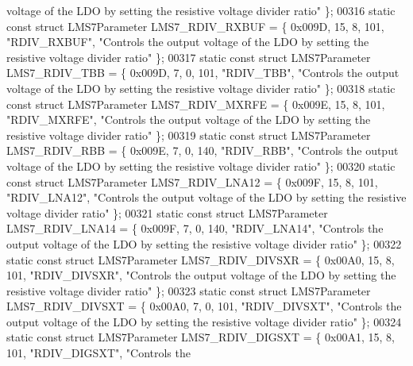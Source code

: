 \begin{DoxyCode}
{       voltage of the LDO by setting the resistive voltage divider ratio"} \};
00316 \textcolor{keyword}{static} \textcolor{keyword}{const} \textcolor{keyword}{struct }LMS7Parameter LMS7_RDIV_RXBUF = \{ 0x009D, 15, 8, 101, \textcolor{stringliteral}{"RDIV\_RXBUF"}, \textcolor{stringliteral}{"Controls the
       output voltage of the LDO by setting the resistive voltage divider ratio"} \};
00317 \textcolor{keyword}{static} \textcolor{keyword}{const} \textcolor{keyword}{struct }LMS7Parameter LMS7_RDIV_TBB = \{ 0x009D, 7, 0, 101, \textcolor{stringliteral}{"RDIV\_TBB"}, \textcolor{stringliteral}{"Controls the output
       voltage of the LDO by setting the resistive voltage divider ratio"} \};
00318 \textcolor{keyword}{static} \textcolor{keyword}{const} \textcolor{keyword}{struct }LMS7Parameter LMS7_RDIV_MXRFE = \{ 0x009E, 15, 8, 101, \textcolor{stringliteral}{"RDIV\_MXRFE"}, \textcolor{stringliteral}{"Controls the
       output voltage of the LDO by setting the resistive voltage divider ratio"} \};
00319 \textcolor{keyword}{static} \textcolor{keyword}{const} \textcolor{keyword}{struct }LMS7Parameter LMS7_RDIV_RBB = \{ 0x009E, 7, 0, 140, \textcolor{stringliteral}{"RDIV\_RBB"}, \textcolor{stringliteral}{"Controls the output
       voltage of the LDO by setting the resistive voltage divider ratio"} \};
00320 \textcolor{keyword}{static} \textcolor{keyword}{const} \textcolor{keyword}{struct }LMS7Parameter LMS7_RDIV_LNA12 = \{ 0x009F, 15, 8, 101, \textcolor{stringliteral}{"RDIV\_LNA12"}, \textcolor{stringliteral}{"Controls the
       output voltage of the LDO by setting the resistive voltage divider ratio"} \};
00321 \textcolor{keyword}{static} \textcolor{keyword}{const} \textcolor{keyword}{struct }LMS7Parameter LMS7_RDIV_LNA14 = \{ 0x009F, 7, 0, 140, \textcolor{stringliteral}{"RDIV\_LNA14"}, \textcolor{stringliteral}{"Controls the output
       voltage of the LDO by setting the resistive voltage divider ratio"} \};
00322 \textcolor{keyword}{static} \textcolor{keyword}{const} \textcolor{keyword}{struct }LMS7Parameter LMS7_RDIV_DIVSXR = \{ 0x00A0, 15, 8, 101, \textcolor{stringliteral}{"RDIV\_DIVSXR"}, \textcolor{stringliteral}{"Controls the
       output voltage of the LDO by setting the resistive voltage divider ratio"} \};
00323 \textcolor{keyword}{static} \textcolor{keyword}{const} \textcolor{keyword}{struct }LMS7Parameter LMS7_RDIV_DIVSXT = \{ 0x00A0, 7, 0, 101, \textcolor{stringliteral}{"RDIV\_DIVSXT"}, \textcolor{stringliteral}{"Controls the
       output voltage of the LDO by setting the resistive voltage divider ratio"} \};
00324 \textcolor{keyword}{static} \textcolor{keyword}{const} \textcolor{keyword}{struct }LMS7Parameter LMS7_RDIV_DIGSXT = \{ 0x00A1, 15, 8, 101, \textcolor{stringliteral}{"RDIV\_DIGSXT"}, \textcolor{stringliteral}{"Controls the
}
\end{DoxyCode}
